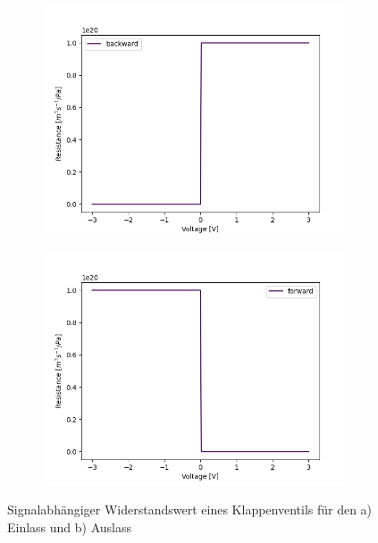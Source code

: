 \documentclass[fontsize=12pt, a4paper]{scrartcl}
\begin{document}
\begin{figure}[H]
	\centering
	\begin{subfigure}[H]{0.48\textwidth}
		\includegraphics[width=\textwidth, valign=t]{bilder/Kennlinien/velve_backwards.png}
	\end{subfigure}
	\begin{subfigure}[H]{0.48\textwidth}
		\includegraphics[width=\textwidth, valign=t]{bilder/Kennlinien/velve_forwards.png}
	\end{subfigure}
	\caption{Signalabhängiger Widerstandswert eines Klappenventils für den a) Einlass und b) Auslass}
	\label{fig:ventilkennlinie}
\end{figure}
\end{document}

